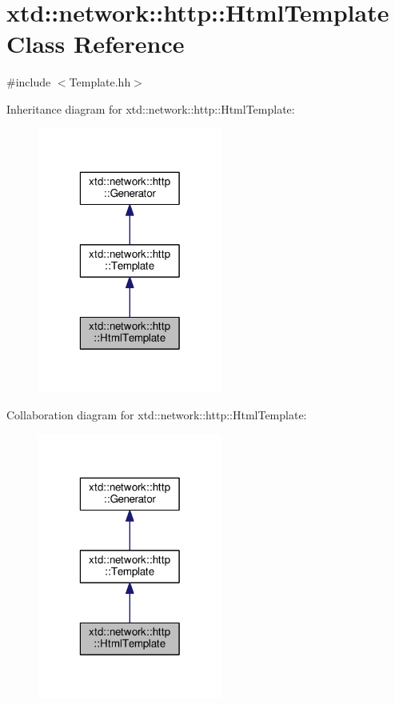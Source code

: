 \hypertarget{classxtd_1_1network_1_1http_1_1HtmlTemplate}{\section{xtd\-:\-:network\-:\-:http\-:\-:Html\-Template Class Reference}
\label{classxtd_1_1network_1_1http_1_1HtmlTemplate}
}


{\ttfamily \#include $<$Template.\-hh$>$}



Inheritance diagram for xtd\-:\-:network\-:\-:http\-:\-:Html\-Template\-:
\nopagebreak
\begin{figure}[H]
\begin{center}
\leavevmode
\includegraphics[width=172pt]{classxtd_1_1network_1_1http_1_1HtmlTemplate__inherit__graph}
\end{center}
\end{figure}


Collaboration diagram for xtd\-:\-:network\-:\-:http\-:\-:Html\-Template\-:
\nopagebreak
\begin{figure}[H]
\begin{center}
\leavevmode
\includegraphics[width=172pt]{classxtd_1_1network_1_1http_1_1HtmlTemplate__coll__graph}
\end{center}
\end{figure}
